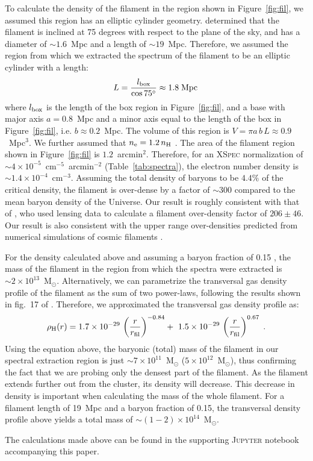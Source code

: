 To calculate the density of the filament in the region shown in Figure~\ref{fig:fil}, we assumed this region has an elliptic cylinder geometry. \citet{Jauzac2012} determined that the filament is inclined at 75 degrees with respect to the plane of the sky, and has a diameter of $\sim 1.6$~Mpc and a length of $\sim 19$~Mpc. Therefore, we assumed the region from which we extracted the spectrum of the filament to be an elliptic cylinder with a length:
\begin{equation}
	L = \frac{l_{\rm box}}{\cos{75^{\circ}}} \approx 1.8 \; {\rm Mpc}\,  \nonumber
\end{equation}
where $l_{\rm box}$ is the length of the box region in Figure~\ref{fig:fil}, and a base with major axis $a = 0.8$~Mpc and a minor axis equal to the length of the box in Figure~\ref{fig:fil}, i.e. $b \approx 0.2$~Mpc. The volume of this region is $V = \pi a\, b \, L \approx 0.9$~Mpc$^3$. We further assumed that $n_{\rm e} = 1.2 \, n_{\rm H}$ \citep{Bohringer2010}. The area of the filament region shown in Figure~\ref{fig:fil} is $1.2$~arcmin$^2$. Therefore, for an \textsc{XSpec} normalization of $\sim 4\times 10^{-5}$~cm$^{-5}$~arcmin${^{-2}}$ (Table~\ref{tab:spectra}), the electron number density is $\sim 1.4\times 10^{-4}$~cm$^{-3}$. Assuming the total density of baryons to be $4.4\%$ of the critical density\citep{Kirkman2003}, the filament is over-dense by a factor of $\sim 300$ compared to the mean baryon density of the Universe. Our result is roughly consistent with that of \citet{Jauzac2012}, who used lensing data to calculate a filament over-density factor of $206 \pm 46$. Our result is also consistent with the upper range over-densities predicted from numerical simulations of cosmic filaments \citep[e.g.,][]{Gheller2015}.

For the density calculated above and assuming a baryon fraction of 0.15 \citep{Mantz2014}, the mass of the filament in the region from which the spectra were extracted is $\sim 2\times 10^{13}$~M$_\odot$. Alternatively, we can parametrize the transversal gas density profile of the filament as the sum of two power-laws, following the results shown in fig.~17 of \citet{Gheller2015}. Therefore, we approximated the transversal gas density profile as:
\begin{equation}
	\rho_{\rm H}(r) = 1.7 \times 10^{-29} \, \left(\frac{r}{r_{\rm fil}}\right)^{-0.84} + \
	                             1.5 \times 10^{-29} \, \left(\frac{r}{r_{\rm fil}}\right)^{0.67}  \;. \nonumber
\end{equation}
Using the equation above, the baryonic (total) mass of the filament in our spectral extraction region is just $\sim 7\times 10^{11}$~M$_\odot$ ($5\times 10^{12}$~M$_\odot$), thus confirming the fact that we are probing only the densest part of the filament. As the filament extends further out from the cluster, its density will decrease. This decrease in density is important when calculating the mass of the whole filament. For a filament length of 19~Mpc and a baryon fraction of 0.15, the transversal density profile above yields a total mass of $\sim (1-2)\times 10^{14}$~M$_\odot$. 

The calculations made above can be found in the supporting \textsc{Jupyter} notebook accompanying this paper.  





